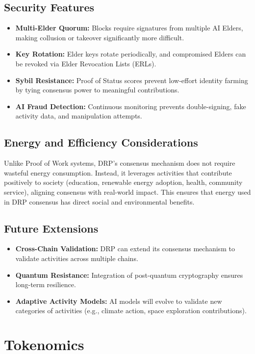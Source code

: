 \documentclass[11pt,a4paper]{article}
\begin{document}
\subsection{Security Features}
\begin{itemize}
    \item \textbf{Multi-Elder Quorum:} Blocks require signatures from multiple AI Elders, making collusion or takeover significantly more difficult.
    \item \textbf{Key Rotation:} Elder keys rotate periodically, and compromised Elders can be revoked via Elder Revocation Lists (ERLs).
    \item \textbf{Sybil Resistance:} Proof of Status scores prevent low-effort identity farming by tying consensus power to meaningful contributions.
    \item \textbf{AI Fraud Detection:} Continuous monitoring prevents double-signing, fake activity data, and manipulation attempts.
\end{itemize}

\subsection{Energy and Efficiency Considerations}
Unlike Proof of Work systems, DRP’s consensus mechanism does not require wasteful energy consumption. 
Instead, it leverages activities that contribute positively to society (education, renewable energy adoption, health, community service), aligning consensus with real-world impact. 
This ensures that energy used in DRP consensus has direct social and environmental benefits.

\subsection{Future Extensions}
\begin{itemize}
    \item \textbf{Cross-Chain Validation:} DRP can extend its consensus mechanism to validate activities across multiple chains.
    \item \textbf{Quantum Resistance:} Integration of post-quantum cryptography ensures long-term resilience.
    \item \textbf{Adaptive Activity Models:} AI models will evolve to validate new categories of activities (e.g., climate action, space exploration contributions).
\end{itemize}

\section{Tokenomics}
\end{document}
